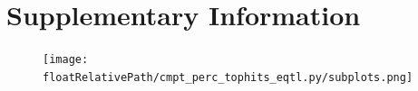 
\onecolumn %
\renewcommand{\floatpagefraction}{0.1}
\newpage

\setcounter{figure}{0} %
\setcounter{equation}{0} %
\renewcommand{\figurename}{Supplementary Figure}


\newpage
\section*{Supplementary Information}

%
%

\begin{figure}[!tbp]
    \centering
    \texttt{[image: \\floatRelativePath/cmpt\_perc\_tophits\_eqtl.py/subplots.png]}

    \caption{}
%
\end{figure}

%
%

